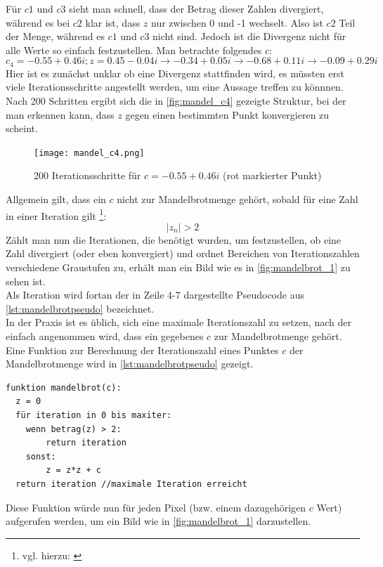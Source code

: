 \documentclass[a4paper,12pt,onesided]{report}
\begin{document}
Für $c1$ und $c3$ sieht man schnell, dass der Betrag dieser Zahlen divergiert, während es bei $c2$ klar ist, dass $z$ nur zwischen 0 und -1 wechselt. Also ist $c2$ Teil der Menge, während es $c1$ und $c3$ nicht sind. Jedoch ist die Divergenz nicht für alle Werte so einfach festzustellen. Man betrachte folgendes $c$:
\[c_4=-0.55 + 0.46i ; z=0.45 - 0.04i \rightarrow -0.34 + 0.05i \rightarrow -0.68 + 0.11i \rightarrow -0.09 + 0.29i\]
Hier ist es zunächst unklar ob eine Divergenz stattfinden wird, es müssten erst viele Iterationsschritte angestellt werden, um eine Aussage treffen zu könnnen. Nach 200 Schritten ergibt sich die in \autoref{fig:mandel_c4} gezeigte Struktur, bei der man erkennen kann, dass $z$ gegen einen bestimmten Punkt konvergieren zu scheint.

\begin{figure}[H]
	\centering
	\texttt{[image: mandel\_c4.png]}
	\caption{200 Iterationsschritte für $c = -0.55 + 0.46i$ (rot markierter Punkt)}
	\label{fig:mandel_c4}
\end{figure}

Allgemein gilt, dass ein $c$ nicht zur Mandelbrotmenge gehört, sobald für eine Zahl in einer Iteration gilt \footnote{vgl. hierzu: \cite{mbrotg2}}:
\[|z_n|>2\]
Zählt man nun die Iterationen, die benötigt wurden, um festzustellen, ob eine Zahl divergiert (oder eben konvergiert) und ordnet Bereichen von Iterationszahlen verschiedene Graustufen zu, erhält man ein Bild wie es in \autoref{fig:mandelbrot_1} zu sehen ist.\\
Als Iteration wird fortan der in Zeile 4-7 dargestellte Pseudocode aus \autoref{lst:mandelbrotpseudo} bezeichnet.\\
In der Praxis ist es üblich, sich eine maximale Iterationszahl zu setzen, nach der einfach angenommen wird, dass ein gegebenes $c$ zur Mandelbrotmenge gehört.\\
Eine Funktion zur Berechnung der Iterationszahl eines Punktes $c$ der Mandelbrotmenge wird in \autoref{lst:mandelbrotpseudo} gezeigt.

\begin{lstlisting}[label=lst:mandelbrotpseudo,caption=Algorithmus zur Berechnung der Iterationszahl eines $c$]
funktion mandelbrot(c):
  z = 0
  für iteration in 0 bis maxiter:
 	wenn betrag(z) > 2:
 		return iteration
 	sonst:	
		z = z*z + c
  return iteration //maximale Iteration erreicht
\end{lstlisting}

Diese Funktion würde nun für jeden Pixel (bzw. einem dazugehörigen $c$ Wert) aufgerufen werden, um ein Bild wie in \autoref{fig:mandelbrot_1} darzustellen.
\end{document}
